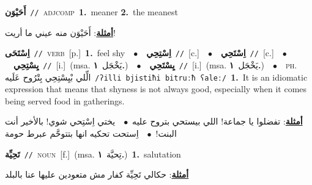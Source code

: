 \documentclass[10pt,a4paper,twoside]{article} %
\begin{document}
\begin{multicols}{2}
{\setlength\topsep{0pt}\textbf{\foreignlanguage{arabic}{أَحَيْوَن}}\ {\color{gray}\texttt{//}\color{black}}\ \textsc{adj\textunderscore comp}\ \textbf{1.}~meaner  \textbf{2.}~the meanest\  \begin{flushright}\color{gray}\foreignlanguage{arabic}{\textbf{\underline{\foreignlanguage{arabic}{أمثلة}}}: أَحَيْوَن منه عيني ما أريت!}\end{flushright}\color{black}} \vspace{2mm}

{\setlength\topsep{0pt}\textbf{\foreignlanguage{arabic}{اِسْتَحَى}}\ {\color{gray}\texttt{//}\color{black}}\ \textsc{verb}\ [p.]\ \textbf{1.}~feel shy\ \ $\bullet$\ \ \setlength\topsep{0pt}\textbf{\foreignlanguage{arabic}{اِسْتِحِي}}\ {\color{gray}\texttt{//}\color{black}}\ [c.]\ \ $\bullet$\ \ \setlength\topsep{0pt}\textbf{\foreignlanguage{arabic}{اِسْتَحِي}}\ {\color{gray}\texttt{//}\color{black}}\ [c.]\ \ $\bullet$\ \ \setlength\topsep{0pt}\textbf{\foreignlanguage{arabic}{يِسْتِحِي}}\ {\color{gray}\texttt{//}\color{black}}\ [i.]\ \color{gray}(msa. \foreignlanguage{arabic}{يَخْجَل}~\foreignlanguage{arabic}{\textbf{١.}})\color{black}\ \ $\bullet$\ \ \setlength\topsep{0pt}\textbf{\foreignlanguage{arabic}{يِسْتَحِي}}\ {\color{gray}\texttt{//}\color{black}}\ [i.]\ \color{gray}(msa. \foreignlanguage{arabic}{يَخْجَل}~\foreignlanguage{arabic}{\textbf{١.}})\color{black}\ \ $\bullet$\ \ \textsc{ph.} \color{gray} \foreignlanguage{arabic}{الِّلي بْيِسْتِحِي بِتْرُوح عَلَيه}\color{black}\ {\color{gray}\texttt{/{\sffamily ʔilli bjistiħi bitruːħ ʕaleː}/}\color{black}}\ \textbf{1.}~It is an idiomatic expression that means that shyness is not always good, especially when it comes being served food in gatherings.\  \begin{flushright}\color{gray}\foreignlanguage{arabic}{\textbf{\underline{\foreignlanguage{arabic}{أمثلة}}}: تفضلوا يا جماعة! اللي بيستحي بتروح عليه\ $\bullet$\ \  يختي اِسْتِحي شوي! بالأخير أنت البنت!\ $\bullet$\ \  اِستحت تحكيه انها بتتوحَّم عبرط حومة}\end{flushright}\color{black}} \vspace{2mm}

{\setlength\topsep{0pt}\textbf{\foreignlanguage{arabic}{تَحِيِّة}}\ {\color{gray}\texttt{//}\color{black}}\ \textsc{noun}\ [f.]\ \color{gray}(msa. \foreignlanguage{arabic}{تِحيَّة}~\foreignlanguage{arabic}{\textbf{١.}})\color{black}\ \textbf{1.}~salutation\  \begin{flushright}\color{gray}\foreignlanguage{arabic}{\textbf{\underline{\foreignlanguage{arabic}{أمثلة}}}: حكالي تَحِيِّة كفار مش متعودين عليها عنا بالبلد}\end{flushright}\color{black}} \vspace{2mm}


\end{multicols}
\end{document}
